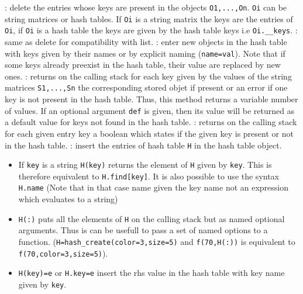   \begin{varlist}
  : delete the entries whose keys are present in the objects
  \verb+O1,...,On+. \verb+Oi+ can be string matrices or hash tables. If \verb+Oi+ is 
  a string matrix the keys are the entries of \verb+Oi+, if \verb+Oi+ is a hash table the 
  keys are given by the hash table keys i.e \verb+Oi.__keys+.
  : same as delete for compatibility with list.
  : enter new objects in the hash table with keys 
  given by their names or by explicit naming (\verb+name=val+). Note that if some keys 
  already preexist in the hash table, their value are replaced by new ones. 
  : returns on the calling stack for each key given by the values of 
  the string matrices \verb+S1,...,Sn+ the corresponding stored objet if present or an 
  error if one key is not present in the hash table. Thus, this method returns a variable 
  number of values. If an optional argument \verb+def+ is given, then its value will be 
  returned as a default value for keys not found in the hash table.
  : returns on the calling stack for each given entry key a boolean 
  which states if the given key is present or not in the hash table.
  : insert the entries of hash table \verb+H+ in the hash table object.
  \end{varlist}

\begin{itemize}
\item If \verb+key+ is a string \verb+H(key)+ returns the element of \verb+H+ given by \verb+key+. 
  This is therefore equivalent to \verb+H.find[key]+. It is also possible to use 
  the syntax \verb+H.name+ (Note that in that case name given the key name not an expression 
  which evaluates to a string) 
\item \verb+H(:)+ puts all the elements of \verb+H+ on the calling stack but as named 
  optional arguments. Thus is can be usefull to pass a set of named options to a function. 
  (\verb+H=hash_create(color=3,size=5)+ and \verb+f(70,H(:))+ is equivalent to 
  \verb+f(70,color=3,size=5)+).
\item \verb+H(key)=e+ or \verb+H.key=e+ insert the rhs value in the hash table with key name 
  given by \verb+key+.
\end{itemize}

